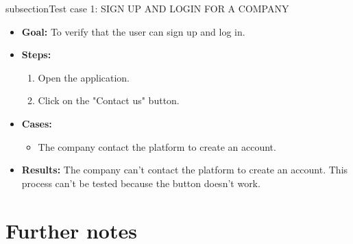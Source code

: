 subsection{Test case 1: SIGN UP AND LOGIN FOR A COMPANY}
\begin{itemize}
    \item \textbf{Goal:} To verify that the user can sign up and log in.

    \item \textbf{Steps:}
    \begin{enumerate}
        \item Open the application.
        \item Click on the "Contact us" button.
    \end{enumerate}
    \item \textbf{Cases:}
    \begin{itemize}
        \item The company contact the platform to create an account.
    \end{itemize}
    \item \textbf{Results:} The company can't contact the platform to create an account.
    This process can't be tested because the button doesn't work.
\end{itemize}




\section{Further notes}